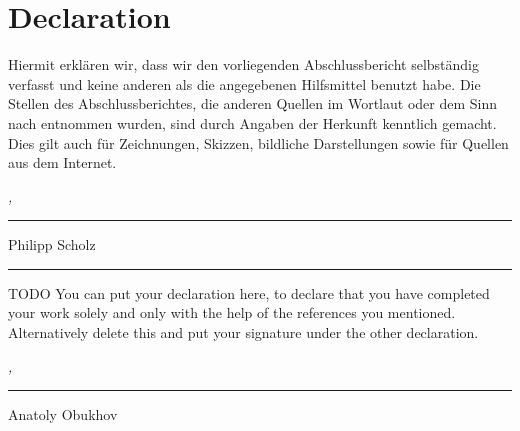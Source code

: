 %
\chapter*{Declaration}
\label{sec:declaration}
\thispagestyle{empty}

Hiermit erklären wir, dass wir den vorliegenden Abschlussbericht selbständig verfasst
und keine anderen als die angegebenen Hilfsmittel benutzt habe. Die Stellen des
Abschlussberichtes, die anderen Quellen im Wortlaut oder dem Sinn nach entnommen
wurden, sind durch Angaben der Herkunft kenntlich gemacht. Dies gilt auch für
Zeichnungen, Skizzen, bildliche Darstellungen sowie für Quellen aus dem Internet.

\bigskip

\noindent\textit{\thesisUniversityCity, \thesisDate}

\smallskip

\begin{flushright}
	\begin{minipage}{5cm}
		\rule{\textwidth}{1pt}
		\centering Philipp Scholz
	\end{minipage}
\end{flushright}

\bigskip
\begin{spacing}{0.05}
\noindent
\rule{\linewidth}{0.5mm}
\end{spacing}
\bigskip

TODO You can put your declaration here, to declare that you have completed your work solely and only with the help of the references you mentioned. Alternatively delete this and put your signature under the other declaration.

\bigskip

\noindent\textit{\thesisUniversityCity, \thesisDate}

\smallskip

\begin{flushright}
	\begin{minipage}{5cm}
		\rule{\textwidth}{1pt}
		\centering Anatoly Obukhov
	\end{minipage}
\end{flushright}


